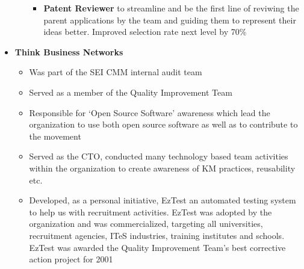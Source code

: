 \documentclass[a4paper,11pt]{article}
\begin{document}
\begin{itemize}
\begin{itemize}
\begin{itemize}
      \item \textbf{Patent Reviewer} to streamline and be the first
        line of reviwing the parent applications by the team and
        guiding them to represent their ideas better. Improved
        selection rate next level by 70\%

      \end{itemize}
      
    \end{itemize}

  \item{\textbf{Think Business Networks}}

    \begin{itemize}
      
      \setlength\itemsep{-0.5em}
      
      \item Was part of the SEI CMM internal audit team 

      \item Served as a member of the Quality Improvement Team 

      \item Responsible for `Open Source Software' awareness which 
        lead the organization to use both open source software as well
        as to contribute to the movement

      \item Served as the CTO, conducted many technology based team
        activities within the organization to create awareness of KM
        practices, reusability etc.

      \item Developed, as a personal initiative, EzTest an automated
        testing system to help us with recruitment activities. EzTest
        was adopted by the organization and was commercialized,
        targeting all universities, recruitment agencies, ITeS
        industries, training institutes and schools. EzTest was
        awarded the Quality Improvement Team's best corrective action
        project for 2001
        
    \end{itemize}
\end{itemize}
\end{document}
